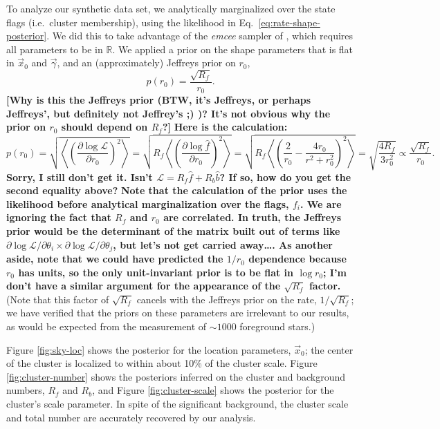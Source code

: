 \documentclass[aps,prd]{revtex4-1}
\newcommand{\ilya}[1]{{\color{red} \bf #1}}
\newcommand{\will}[1]{{\color{blue} \bf #1}}
\begin{document}
To analyze our synthetic data set, we analytically marginalized over
the state flags (i.e.~cluster membership), using the likelihood in
Eq.~\eqref{eq:rate-shape-posterior}.  We did this to take advantage of
the \textit{emcee} sampler of \citet{ForemanMackey2012}, which
requires all parameters to be in $\mathbb{R}$.  We applied a prior on
the shape parameters that is flat in $\vec{x}_0$ and $\vec{\gamma}$,
and an (approximately) Jeffreys prior on $r_0$,
\begin{equation}
  p\left( r_0 \right) = \frac{\sqrt{R_f}}{r_0}.
\end{equation}
\ilya{[Why is this the Jeffreys prior (BTW, it's Jeffreys, or perhaps
    Jeffreys', but definitely not Jeffrey's ;) )?  It's not obvious
    why the prior on $r_0$ should depend on $R_f$?]}  \will{Here is
  the calculation:
\begin{equation}
  p\left( r_0 \right) = \sqrt{\left\langle \left(\frac{\partial \log
      \mathcal{L}}{\partial r_0 } \right)^2 \right\rangle} = \sqrt{
    R_f \left\langle \left(\frac{\partial \log\hat{f}}{\partial r_0
    }\right)^2 \right\rangle } = \sqrt{R_f \left\langle \left(
    \frac{2}{r_0} - \frac{4 r_0}{r^2 + r_0^2} \right)^2 \right\rangle}
  = \sqrt{\frac{ 4 R_f}{3 r_0^2}} \propto \frac{\sqrt{R_f}}{r_0}.
\end{equation}
}\ilya{Sorry, I still don't get it.  Isn't $\mathcal{L} = R_f \hat{f} + R_b \hat{b}$?  If so, how do you get the second equality above?}
\will{Note that the calculation of the prior uses the likelihood before
analytical marginalization over the flags, $f_i$.  We are ignoring the
fact that $R_f$ and $r_0$ are correlated.  In truth, the Jeffreys
prior would be the determinant of the matrix built out of terms like
$\partial \log\mathcal{L} / \partial \theta_i \times \partial
\log\mathcal{L} /\partial \theta_j$, but let's not get carried
away\ldots.  As another aside, note that we could have predicted the
$1/r_0$ dependence because $r_0$ has units, so the only unit-invariant
prior is to be flat in $\log r_0$; I'm don't have a similar argument
for the appearance of the $\sqrt{R_f}$ factor.}  (Note that this
factor of $\sqrt{R_f}$ cancels with the Jeffreys prior on the rate,
$1/\sqrt{R_f}$; we have verified that the priors on these parameters
are irrelevant to our results, as would be expected from the
measurement of $\sim 1000$ foreground stars.)

Figure \ref{fig:sky-loc} shows the posterior for the location
parameters, $\vec{x}_0$; the center of the cluster is localized to
within about 10\% of the cluster scale.  Figure
\ref{fig:cluster-number} shows the posteriors inferred on the cluster
and background numbers, $R_f$ and $R_b$, and Figure
\ref{fig:cluster-scale} shows the posterior for the cluster's scale
parameter.  In spite of the significant background, the cluster scale
and total number are accurately recovered by our analysis.
\end{document}
